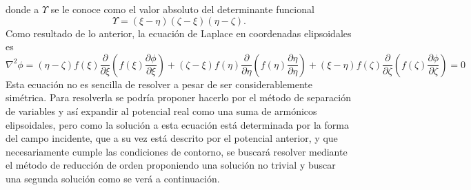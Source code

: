 \documentclass[paper=letter, fontsize=12pt,]{article}
\begin{document}
donde a $\Upsilon$ se le conoce como el valor absoluto del determinante funcional \cite{Kellogg}
\begin{equation}
    \Upsilon=(\xi-\eta)(\zeta-\xi)(\eta-\zeta).
\end{equation}
Como resultado de lo anterior, la ecuación de Laplace en coordenadas elipsoidales es
\begin{equation}
    \nabla^2\phi=(\eta-\zeta)f(\xi)\frac{\partial}{\partial\xi}\left(f(\xi)\frac{\partial\phi}{\partial\xi}\right)+(\zeta-\xi)f(\eta)\frac{\partial}{\partial\eta}\left(f(\eta)\frac{\partial\eta}{\partial\eta}\right)+(\xi-\eta)f(\zeta)\frac{\partial}{\partial\zeta}\left(f(\zeta)\frac{\partial\phi}{\partial\zeta}\right)=0
    \label{laplaceplisoidal}
\end{equation}
Esta ecuación no es sencilla de resolver a pesar de ser considerablemente simétrica. Para resolverla se podría proponer hacerlo por el método de separación de variables y así expandir al potencial real como una suma de armónicos  elipsoidales, pero como la solución a esta ecuación está determinada por la forma del campo
incidente, que a su vez está descrito por el potencial anterior, y que necesariamente cumple las condiciones de contorno, se buscará resolver mediante el método de reducción de orden proponiendo una solución no trivial y buscar una segunda solución como se verá a continuación.\\
\end{document}
